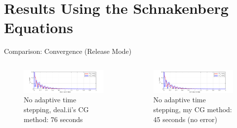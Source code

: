 \documentclass{beamer}
\begin{document}
        

        
    

        
    \section[Results]{Results Using the Schnakenberg Equations}
    
        \begin{frame}{Comparison: Convergence (Release Mode)}
        
            \begin{columns}
            
            \vspace{-.2cm}
            \begin{figure}
                \centering
                \includegraphics[width = \textwidth, trim={1cm 0cm 1cm 0cm},clip]{Images/none.png}
                \caption*{No adaptive time stepping, deal.ii's CG method: 76 seconds}
                \label{fig:my_label}
            \end{figure}
            
            \vspace{-.2cm}
            
            \begin{figure}
                \centering
                \includegraphics[width = \textwidth, trim={1cm 0cm 1cm 0cm},clip]{Images/none.png}
                \caption*{No adaptive time stepping, my CG method: 45 seconds (no error)}
                \label{fig:my_label}
            \end{figure}
            
            \vspace{-.2cm}
            

\end{columns}
\end{frame}
\end{document}
